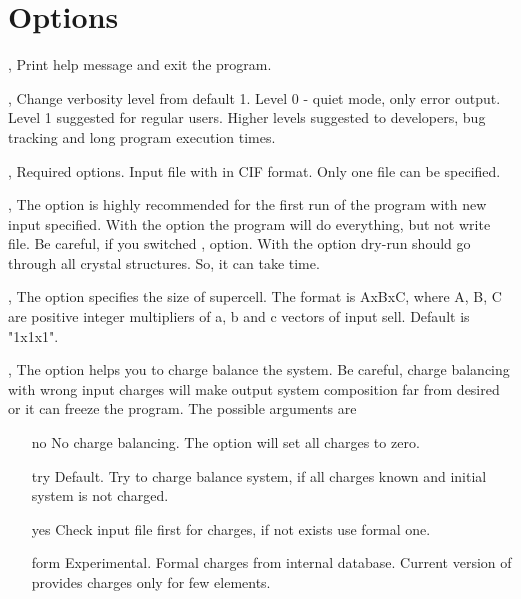\documentclass[a4paper,english]{article}
\begin{document}
\section{Options}
\begin{Description}

\item[\Opt{-h}, \Opt{--help}]
      Print help message and exit the program.

\item[\OptArg{-v }{level}, \OptArg{--verbose=}{level}] 
      Change verbosity level from default 1. Level 0 - quiet mode, only error output. Level 1 suggested for regular users. Higher levels suggested to developers, bug tracking and long program execution times. 

\item[\OptArg{-i }{input-file}, \OptArg{--input=}{input-file}]
      Required options. Input file with in CIF format. Only one file can be specified.

\item[\Opt{-d}, \Opt{--dry-run}]
      The option is highly recommended for the first run of the program with new input specified. 
      With the option the program will do everything, but not write file. Be careful, if you switched ,  option. With the option dry-run should go through all crystal structures. So, it can take time.

\item[\OptArg{-s }{cell-size}, \OptArg{--cell-size=}{cell-size}]
      The option specifies the size of supercell. The format is AxBxC, where A, B, C are positive integer multipliers of a, b and c vectors of input sell. Default is "1x1x1".

\item[\OptArg{-c }{balance-type}, \OptArg{--charge-balance=}{balance-type}]
      The option helps you to charge balance the system. Be careful, charge balancing with wrong input charges will make output system composition far from desired or it can freeze the program. The possible arguments are
      \begin{itemize}
         \item[no]   No charge balancing. The option will set all charges to zero.
         \item[try]  Default. Try to charge balance system, if all charges known and initial system is not charged.
         \item[yes]  Check input file first for charges, if not exists use formal one.
         \item[form] Experimental. Formal charges from internal  database. Current version of  provides charges only for few elements. 
      \end{itemize}


\end{Description}
\end{document}
